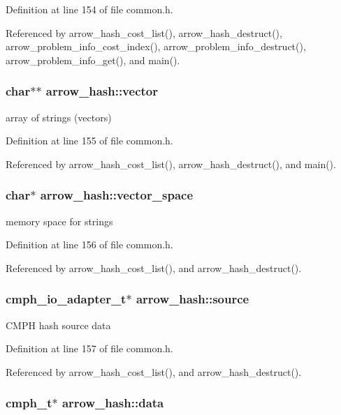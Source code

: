 Definition at line 154 of file common.h.

Referenced by arrow\_\-hash\_\-cost\_\-list(), arrow\_\-hash\_\-destruct(), arrow\_\-problem\_\-info\_\-cost\_\-index(), arrow\_\-problem\_\-info\_\-destruct(), arrow\_\-problem\_\-info\_\-get(), and main().\hypertarget{structarrow__hash_91eeed74d32d354b4e8b03be8b51f058}{
\subsubsection{\setlength{\rightskip}{0pt plus 5cm}char$\ast$$\ast$ {\bf arrow\_\-hash::vector}}}
\label{structarrow__hash_91eeed74d32d354b4e8b03be8b51f058}


array of strings (vectors) 

Definition at line 155 of file common.h.

Referenced by arrow\_\-hash\_\-cost\_\-list(), arrow\_\-hash\_\-destruct(), and main().\hypertarget{structarrow__hash_298c5f151d99d62d6be200a620a4b4c3}{
\subsubsection{\setlength{\rightskip}{0pt plus 5cm}char$\ast$ {\bf arrow\_\-hash::vector\_\-space}}}
\label{structarrow__hash_298c5f151d99d62d6be200a620a4b4c3}


memory space for strings 

Definition at line 156 of file common.h.

Referenced by arrow\_\-hash\_\-cost\_\-list(), and arrow\_\-hash\_\-destruct().\hypertarget{structarrow__hash_202a3f5b2689ae35543ef2c7ea84a6c2}{
\subsubsection{\setlength{\rightskip}{0pt plus 5cm}cmph\_\-io\_\-adapter\_\-t$\ast$ {\bf arrow\_\-hash::source}}}
\label{structarrow__hash_202a3f5b2689ae35543ef2c7ea84a6c2}


CMPH hash source data 

Definition at line 157 of file common.h.

Referenced by arrow\_\-hash\_\-cost\_\-list(), and arrow\_\-hash\_\-destruct().\hypertarget{structarrow__hash_9f6c6f476d93187dd1436eac92bd8d53}{
\subsubsection{\setlength{\rightskip}{0pt plus 5cm}cmph\_\-t$\ast$ {\bf arrow\_\-hash::data}}}
\label{structarrow__hash_9f6c6f476d93187dd1436eac92bd8d53}


